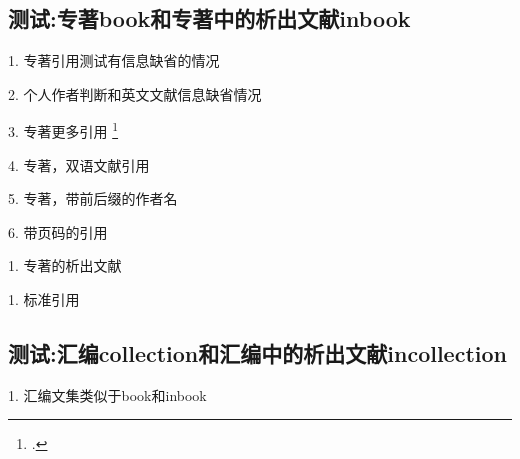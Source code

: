 \documentclass[11pt]{article} %
\begin{document}
\subsection{测试:专著book和专著中的析出文献inbook}\label{sec:test:book}

\begin{refsection}
1. 专著引用测试有信息缺省的情况
\cite{余敏2001-179-193,余敏2001-179-193a,余敏2001-179-193b,booknoauthor,booknodate,booknolocation,booknopublisher,booknopages, 余敏2001-179-193c}

2. 个人作者判断和英文文献信息缺省情况
\cite{Parsons2000a--,Parsons2000b--,Parsons2000noloc--,Parsons2000nopub--,Parsons2000--,Parsons2000nodate--,Parsons2000noauthor--}

3. 专著更多引用
\cite{GPS1988--}\cite{顾炎武1982--}\cite{赵耀东1998--}\cite{PIGGOT1990--}\cite{PEEBLES2001--}\cite{王夫之1845--}
\cite{Poisel2013--}\cite{张伯伟2002--}\cite{2009-155-155}\footcite{赵学功2001--}\cite{Simon2001--}

4. 专著，双语文献引用\cite{bilangyi2013}

5. 专著，带前后缀的作者名\cite{Peebles2001-100-100}

6. 带页码的引用
\parencite[见][49页]{Miroslav2004--}\cite[见][49页]{蔡敏2006--}



\printbibliography[heading=bibliography,title=【专著】]
\end{refsection}


\begin{refsection}

1. 专著的析出文献\cite{马克思2013-302-302}\cite{王夫之2011-1109-1109}

\printbibliography[heading=bibliography,title=【专著中的析出文献】]
\end{refsection}

\begin{refsection}
1. 标准引用\cite{book3}

\printbibliography[heading=bibliography,title=【标准】]
\end{refsection}

\subsection{测试:汇编collection和汇编中的析出文献incollection}
\begin{refsection}
1. 汇编文集类似于book和inbook
\cite{ainbook2,中国职工教育研究会1985--}

\printbibliography[heading=bibliography,title=【汇编或文集】]
\end{refsection}
\end{document}
